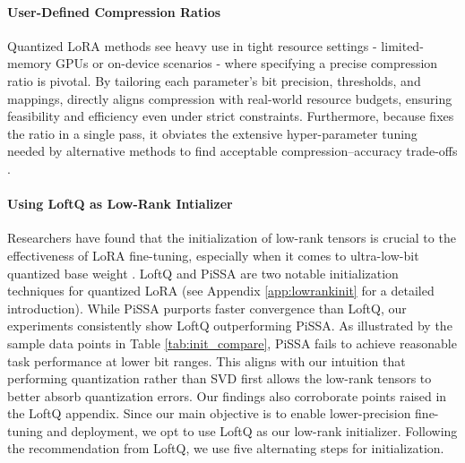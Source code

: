 
\paragraph{User-Defined Compression Ratios} 
Quantized LoRA methods see heavy use in tight resource settings - \eg limited-memory GPUs or on-device scenarios - where specifying a precise compression ratio is pivotal. By tailoring each parameter’s bit precision, thresholds, and mappings, \FWName directly aligns compression with real-world resource budgets, ensuring feasibility and efficiency even under strict constraints. Furthermore, because \FWName fixes the ratio in a single pass, it obviates the extensive hyper-parameter tuning needed by alternative methods to find acceptable compression–accuracy trade-offs \cite{savarese2022not,zhou2023sysmol}.


\paragraph{Using LoftQ as Low-Rank Intializer}
Researchers have found that the initialization of low-rank tensors is crucial to the effectiveness of LoRA fine-tuning, especially when it comes to ultra-low-bit quantized base weight \cite{li2023loftq, meng2024pissa,wang2024lora}. LoftQ \cite{li2023loftq} and PiSSA \cite{meng2024pissa} are two notable initialization techniques for quantized LoRA (see Appendix \ref{app:lowrankinit} for a detailed introduction).  While PiSSA  purports faster convergence than LoftQ, our experiments consistently show LoftQ outperforming PiSSA. As illustrated by the sample data points in Table \ref{tab:init_compare}, PiSSA fails to achieve reasonable task performance at lower bit ranges. This aligns with our intuition that performing quantization rather than SVD first allows the low-rank tensors to better absorb quantization errors. Our findings also corroborate points raised in the LoftQ appendix. Since our main objective is to enable lower-precision fine-tuning and deployment, we opt to use LoftQ as our low-rank initializer. Following the recommendation from LoftQ, we use five alternating steps for initialization.


